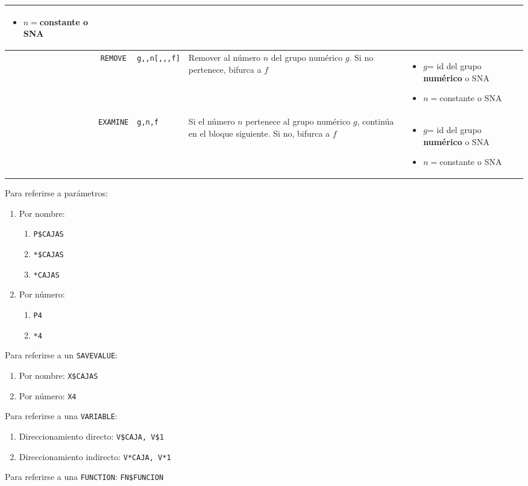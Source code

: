 \documentclass[12pt, a4paper, twoside]{paquetes-apunte/apunte}
\providecommand{\tabularnewline}{\\}
\begin{document}
\begin{longtable}{|lc>{\raggedright}p{3cm}|>{\raggedright}p{5cm}|>{\raggedright}p{7cm}|>{\raggedright}p{4cm}|}
\begin{itemize}
\item $n=$constante o SNA\end{itemize}
 & \tabularnewline
\hline 
 & \texttt{REMOVE} & \texttt{g,,n{[},,,f{]}} & Remover al número $n$ del grupo numérico $g$. Si no pertenece, bifurca
a $f$ & \begin{itemize}
\item $g$= id del grupo \textbf{numérico} o SNA
\item $n=$constante o SNA\end{itemize}
 & \tabularnewline
\hline 
 & \texttt{EXAMINE} & \texttt{g,n,f} & Si el número $n$ pertenece al grupo numérico $g$, continúa en el
bloque siguiente. Si no, bifurca a $f$ & \begin{itemize}
\item $g$= id del grupo \textbf{numérico} o SNA
\item $n=$constante o SNA\end{itemize}
 & \tabularnewline
\hline 
\end{longtable}

\pagebreak{}Para referirse a parámetros:
\begin{enumerate}
\item Por nombre: 

\begin{enumerate}
\item \texttt{P\$CAJAS}
\item \texttt{{*}\$CAJAS}
\item \texttt{{*}CAJAS}
\end{enumerate}
\item Por número:

\begin{enumerate}
\item \texttt{P4}
\item \texttt{{*}4}
\end{enumerate}
\end{enumerate}
Para referirse a un \texttt{SAVEVALUE}:
\begin{enumerate}
\item Por nombre: \texttt{X\$CAJAS}
\item Por número: \texttt{X4}
\end{enumerate}
Para referirse a una \texttt{VARIABLE}: 
\begin{enumerate}
\item Direccionamiento directo: \texttt{V\$CAJA, V\$1}
\item Direccionamiento indirecto: \texttt{V{*}CAJA, V{*}1}
\end{enumerate}
Para referirse a una \texttt{FUNCTION}: \texttt{FN\$FUNCION}
\end{document}
